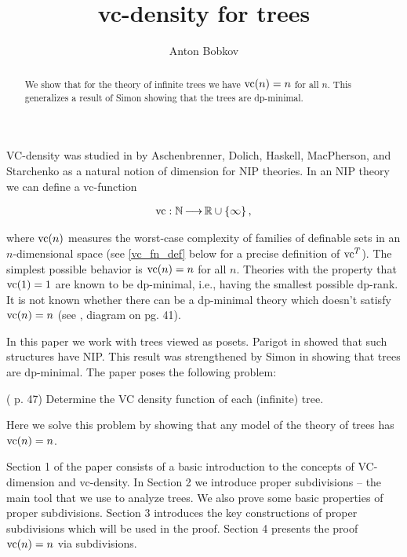 \documentclass{amsart}
\newcommand{\curly}[1]{\left\{#1\right\}}
\begin{document}
\title{vc-density for trees}
\author{Anton Bobkov}

\begin{abstract}
  We show that for the theory of infinite trees we have $\operatorname{vc}(n) = n$ for all $n$.
  This generalizes a result of Simon showing that the trees are dp-minimal. 
\end{abstract}

\maketitle

VC-density was studied in \cite{density} by Aschenbrenner, Dolich, Haskell, MacPherson, and Starchenko as a natural notion of dimension for NIP theories. In an NIP theory we can define a vc-function

\begin{align*}
  \vc : \N \arr \R \cup \curly{\infty},
\end{align*}

where $\operatorname{vc}(n)$ measures the worst-case complexity of families of definable sets in an $n$-dimensional space
(see \ref{vc_fn_def} below for a precise definition of $\operatorname{vc}^T$).
The simplest possible behavior is $\operatorname{vc}(n) = n$ for all $n$. Theories with the property that $\operatorname{vc}(1) = 1$ are known to be dp-minimal, i.e., having the smallest possible dp-rank. It is not known whether there can be a dp-minimal theory which doesn't satisfy $\operatorname{vc}(n)=n$
(see \cite{density}, diagram on pg. 41).

In this paper we work with trees viewed as posets.
Parigot in \cite{parigot_trees} showed that such structures have NIP.
This result was strengthened by Simon in \cite{simon_dp_min} showing that trees are dp-minimal.
The paper \cite{density} poses the following problem:

\begin{Problem} (\cite{density} p. 47)
  Determine the VC density function of each (infinite) tree.
\end{Problem}

Here we solve this problem by showing that any model of the theory of trees has $\operatorname{vc}(n) = n$.

Section 1 of the paper consists of a basic introduction to the concepts of VC-dimension and vc-density.
In Section 2 we introduce proper subdivisions -- the main tool that we use to analyze trees.
We also prove some basic properties of proper subdivisions.
Section 3 introduces the key constructions of proper subdivisions which will be used in the proof.
Section 4 presents the proof $\operatorname{vc}(n) = n$ via subdivisions.
\end{document}
